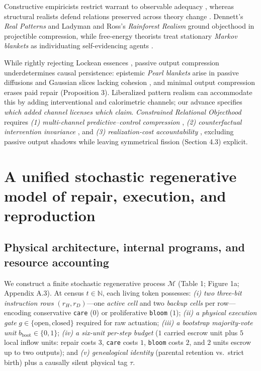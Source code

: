 \documentclass[11pt,letterpaper]{article}
\begin{document}
Constructive empiricists restrict warrant to observable adequacy
\citep{vanFraassen1980}, whereas structural realists defend relations
preserved across theory change \citep{worrall1989, ladyman1998}.
Dennett's \citeyearpar{dennett1991} \emph{Real Patterns} and Ladyman and
Ross's \citeyearpar{ladymanRoss2007} \emph{Rainforest Realism} ground
objecthood in projectible compression, while free-energy theorists treat
stationary \emph{Markov blankets} as individuating self-evidencing
agents \citep{friston2013, parrPezzuloFriston2022}.

While rightly rejecting Lockean essences
\citep{whitehead1929, dupre1993, dupreNicholson2018}, passive output
compression underdetermines causal persistence: epistemic \emph{Pearl
blankets} arise in passive diffusions and Gaussian slices lacking
cohesion \citep{raja2021, bruineberg2022, biehl2021}, and minimal output
compression erases paid repair (Proposition 3). Liberalized pattern
realism can accommodate this by adding interventional and calorimetric
channels; our advance specifies \emph{which added channel licenses which
claim}. \emph{Constrained Relational Objecthood} requires \emph{(1)
multi-channel predictive--control compression} \citep{wimsatt2007},
\emph{(2) counterfactual intervention invariance}
\citep{hacking1983, woodward2003, craver2007}, and \emph{(3)
realization-cost accountability}
\citep{jonas1966, rosen1991, montevilMossio2015}, excluding passive
output shadows \citep{cartwright1999} while leaving symmetrical fission
(Section 4.3) explicit.

\section{A unified stochastic regenerative model of repair, execution,
and
reproduction}\label{a-unified-stochastic-regenerative-model-of-repair-execution-and-reproduction}

\subsection{Physical architecture, internal programs, and resource
accounting}\label{physical-architecture-internal-programs-and-resource-accounting}

We construct a finite stochastic regenerative process \(\mathcal{M}\)
(Table 1; Figure 1a; Appendix A.3). At census \(t \in \mathbb{N}\), each
living token possesses: \emph{(i) two three-bit instruction rows}
\((r_H, r_D)\)---one \emph{active cell} and two \emph{backup cells} per
row---encoding conservative \texttt{care} (\(0\)) or proliferative
\texttt{bloom} (\(1\)); \emph{(ii) a physical execution gate}
\(g \in \{\mathrm{open}, \mathrm{closed}\}\) required for raw actuation;
\emph{(iii) a bootstrap majority-vote unit}
\(b_{\mathrm{boot}} \in \{0,1\}\); \emph{(iv) a six-unit per-step
budget} (\(1\) carried escrow unit plus \(5\) local inflow units: repair
costs \(3\), \texttt{care} costs \(1\), \texttt{bloom} costs \(2\), and
\(2\) units escrow up to two outputs); and \emph{(v) genealogical
identity} (parental retention vs.~strict birth) plus a causally silent
physical tag \(\tau\).
\end{document}
